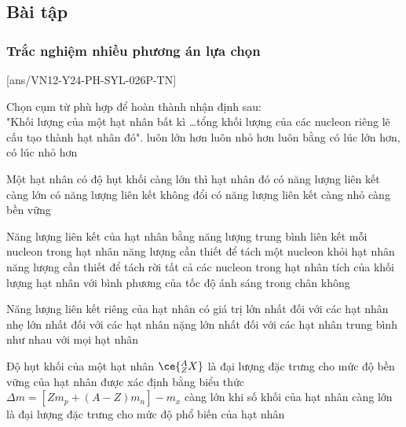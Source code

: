 \subsection{Bài tập}
\subsubsection{Trắc nghiệm nhiều phương án lựa chọn}
\setcounter{ex}{0}
[ans/VN12-Y24-PH-SYL-026P-TN]
\begin{ex}
	Chọn cụm từ phù hợp để hoàn thành nhận định sau: \\
	"Khối lượng của một hạt nhân bất kì \dots tổng khối lượng của các nucleon riêng lẽ cấu tạo thành hạt nhân đó".
	\choice
	{luôn lớn hơn}
	{\True luôn nhỏ hơn}
	{luôn bằng}
	{có lúc lớn hơn, có lúc nhỏ hơn}
	\loigiai{}
\end{ex}
\begin{ex}
	Một hạt nhân có độ hụt khối càng lớn thì hạt nhân đó
	\choice
	{\True có năng lượng liên kết càng lớn}
	{có năng lượng liên kết không đổi}
	{có năng lượng liên kết càng nhỏ}
	{càng bền vững}
	\loigiai{}
\end{ex}
\begin{ex}
	Năng lượng liên kết của hạt nhân bằng
	\choice
	{năng lượng trung bình liên kết mỗi nucleon trong hạt nhân}
	{năng lượng cần thiết để tách một nucleon khỏi hạt nhân}
	{\True năng lượng cần thiết để tách rời tất cả các nucleon trong hạt nhân}
	{tích của khối lượng hạt nhân với bình phương của tốc độ ánh sáng trong chân không}
	\loigiai{}
\end{ex}
\begin{ex}
	Năng lượng liên kết riêng của hạt nhân có giá trị	
	\choice
	{lớn nhất đối với các hạt nhân nhẹ}
	{lớn nhất đối với các hạt nhân nặng}
	{\True lớn nhất đối với các hạt nhân trung bình}
	{như nhau với mọi hạt nhân}
	\loigiai{}
\end{ex}
\begin{ex}
	Độ hụt khối của một hạt nhân $\ce{_Z^AX}$
	\choice
	{là đại lượng đặc trưng cho mức độ bền vững của hạt nhân}
	{\True được xác định bằng biểu thức $\Delta m=\left[Z m_{p}+\left(A-Z\right) m_{n}\right]-m_{x}$}
	{càng lớn khi số khối của hạt nhân càng lớn}
	{là đại lượng đặc trưng cho mức độ phổ biến của hạt nhân}
	\loigiai{}
\end{ex}
